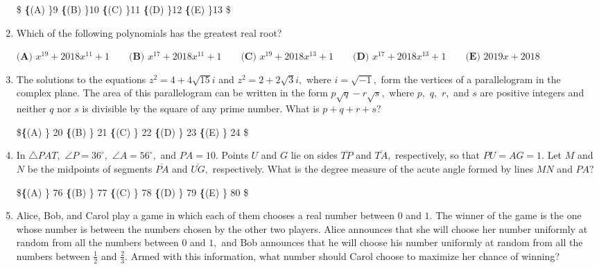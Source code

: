 \documentclass{article}
\begin{document}
\begin{enumerate}[label=\arabic*., itemsep=0.5em]
\$
\textbf\{(A) \}9 \qquad
\textbf\{(B) \}10 \qquad
\textbf\{(C) \}11 \qquad
\textbf\{(D) \}12 \qquad
\textbf\{(E) \}13 \qquad
\$\par \vspace{0.5em}\item Which of the following polynomials has the greatest real root?

$\textbf{(A) }   x^{19}+2018x^{11}+1   \qquad        \textbf{(B) }   x^{17}+2018x^{11}+1   \qquad    \textbf{(C) }   x^{19}+2018x^{13}+1   \qquad   \textbf{(D) }  x^{17}+2018x^{13}+1 \qquad  \textbf{(E) }   2019x+2018 $\par \vspace{0.5em}\item The solutions to the equations $z^2=4+4\sqrt{15}i$ and $z^2=2+2\sqrt 3i,$ where $i=\sqrt{-1},$ form the vertices of a parallelogram in the complex plane. The area of this parallelogram can be written in the form $p\sqrt q-r\sqrt s,$ where $p,$ $q,$ $r,$ and $s$ are positive integers and neither $q$ nor $s$ is divisible by the square of any prime number. What is $p+q+r+s?$

\$\textbf\{(A) \} 20 \qquad 
\textbf\{(B) \} 21 \qquad 
\textbf\{(C) \} 22 \qquad 
\textbf\{(D) \} 23 \qquad 
\textbf\{(E) \} 24 \$\par \vspace{0.5em}\item In $\triangle PAT,$ $\angle P=36^{\circ},$ $\angle A=56^{\circ},$ and $PA=10.$ Points $U$ and $G$ lie on sides $\overline{TP}$ and $\overline{TA},$ respectively, so that $PU=AG=1.$ Let $M$ and $N$ be the midpoints of segments $\overline{PA}$ and $\overline{UG},$ respectively. What is the degree measure of the acute angle formed by lines $MN$ and $PA?$

\$\textbf\{(A) \} 76 \qquad 
\textbf\{(B) \} 77 \qquad 
\textbf\{(C) \} 78 \qquad 
\textbf\{(D) \} 79 \qquad 
\textbf\{(E) \} 80 \$\par \vspace{0.5em}\item Alice, Bob, and Carol play a game in which each of them chooses a real number between $0$ and $1.$ The winner of the game is the one whose number is between the numbers chosen by the other two players. Alice announces that she will choose her number uniformly at random from all the numbers between $0$ and $1,$ and Bob announces that he will choose his number uniformly at random from all the numbers between $\tfrac{1}{2}$ and $\tfrac{2}{3}.$ Armed with this information, what number should Carol choose to maximize her chance of winning?


\end{enumerate}
\end{document}
